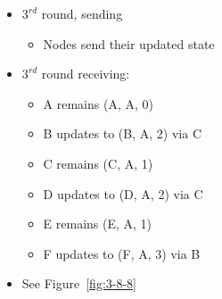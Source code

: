 \documentclass[12pt]{ctexart}   %
\begin{document}
\begin{itemize}
		\item $3^{rd}$ round, sending
		\begin{itemize}
			\item Nodes send their updated state
		\end{itemize}
		
		\item $3^{rd}$ round receiving:
		\begin{itemize}
			\item A remains (A, A, 0)
			\item B updates to (B, A, 2) via C
			\item C remains (C, A, 1)
			\item D updates to (D, A, 2) via C
			\item E remains (E, A, 1)
			\item F updates to (F, A, 3) via B
		\end{itemize}
		
		\item See Figure~\ref{fig:3-8-8}
		

\end{itemize}
\end{document}
